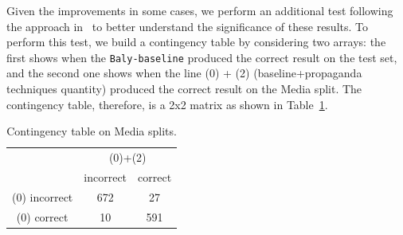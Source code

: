 Given the improvements in some cases, we perform an additional test following the approach in~\citet{mcnemar1947note} 
to better understand the significance of these results. %
To perform this test, we build a contingency table by considering two arrays: the first shows when the \texttt{Baly-baseline} produced the correct result on the test set, and the second one shows when the line (0) + (2) (baseline+propaganda techniques quantity) produced the correct result on the Media split. The contingency table, therefore, is a 2x2 matrix as shown in 
Table~\ref{tab:contingency2}.


\begin{table}[]
    \centering
\small
    \begin{tabular}{c|c|c}
        & \multicolumn{2}{c}{(0)+(2)} \\
         & incorrect & correct \\
         \hline
        (0) incorrect & 672 & 27 \\
        (0) correct & 10 & 591
    \end{tabular}
    \caption{Contingency table on Media splits.}
    \label{tab:contingency2}
\end{table}



